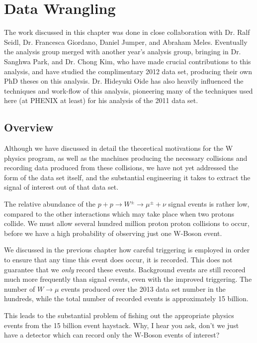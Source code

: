\chapter{Data Wrangling}
The work discussed in this chapter was done in close collaboration with Dr. Ralf
Seidl, Dr. Francesca Giordano, Daniel Jumper, and Abraham Meles. Eventually the
analysis group merged with another year's analysis group, bringing in Dr. Sanghwa
Park, and Dr. Chong Kim, who have made crucial contributions to this analysis,
and have studied the complimentary 2012 data set, producing their own PhD theses
on this analysis. Dr. Hideyuki Oide has also heavily influenced the techniques
and work-flow of this analysis, pioneering many of the techniques used here (at
PHENIX at least) for his analysis of the 2011 data set.

\label{ch:data_collection}
\section{Overview}
Although we have discussed in detail the theoretical motivations for the W
physics program, as well as the machines producing the necessary collisions and
recording data produced from these collisions, we have not yet addressed the
form of the data set itself, and the substantial engineering it takes to extract
the signal of interest out of that data set.

The relative abundance of the $p + p \rightarrow W^\pm \rightarrow \mu^\pm +
\nu$ signal events is rather low, compared to the other interactions which may
take place when two protons collide. We must allow several hundred million
proton proton collisions to occur, before we have a high probability of
observing just one W-Boson event. 

We discussed in the previous chapter how careful triggering is employed in order
to ensure that any time this event does occur, it is recorded. This does not
guarantee that we \textit{only} record these events. Background events are still
recored much more frequently than signal events, even with the improved
triggering. The number of $W\rightarrow\mu$ events produced over the 2013 data
set number in the hundreds, while the total number of recorded events is
approximately 15 billion.

This leads to the substantial problem of fishing out the appropriate physics
events from the 15 billion event haystack. Why, I hear you ask, don't we just
have a detector which can record only the W-Boson events of interest?

